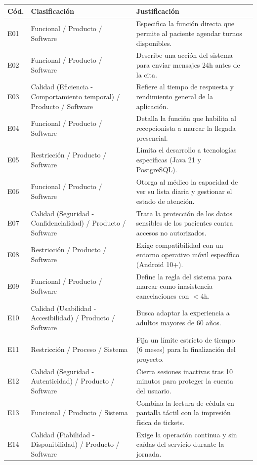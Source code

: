 \documentclass[11pt, a4paper]{article}
\begin{document}
\begin{table}[h!]
\small
\centering
\begin{tabularx}{\textwidth}{l X X l}
\toprule
\textbf{C\'od.} & \textbf{Clasificaci\'on} & \textbf{Justificaci\'on} \\
\midrule
E01 & Funcional / Producto / Software & Especifica la funci\'on directa que permite al paciente agendar turnos disponibles. \\
E02 & Funcional / Producto / Software & Describe una acci\'on del sistema para enviar mensajes 24h antes de la cita. \\
E03 & Calidad (Eficiencia - Comportamiento temporal) / Producto / Software & Refiere al tiempo de respuesta y rendimiento general de la aplicaci\'on. \\
E04 & Funcional / Producto / Software & Detalla la funci\'on que habilita al recepcionista a marcar la llegada presencial. \\
E05 & Restricci\'on / Producto / Software & Limita el desarrollo a tecnolog\'ias espec\'ificas (Java 21 y PostgreSQL). \\
E06 & Funcional / Producto / Software & Otorga al m\'edico la capacidad de ver su lista diaria y gestionar el estado de atenci\'on. \\
E07 & Calidad (Seguridad - Confidencialidad) / Producto / Software & Trata la protecci\'on de los datos sensibles de los pacientes contra accesos no autorizados. \\
E08 & Restricci\'on / Producto / Software & Exige compatibilidad con un entorno operativo m\'ovil espec\'ifico (Android 10+). \\
E09 & Funcional / Producto / Software & Define la regla del sistema para marcar como inasistencia cancelaciones con $<$4h. \\
E10 & Calidad (Usabilidad - Accesibilidad) / Producto / Software & Busca adaptar la experiencia a adultos mayores de 60 a\~nos. \\
E11 & Restricci\'on / Proceso / Sistema & Fija un l\'imite estricto de tiempo (6 meses) para la finalizaci\'on del proyecto. \\
E12 & Calidad (Seguridad - Autenticidad) / Producto / Software & Cierra sesiones inactivas tras 10 minutos para proteger la cuenta del usuario. \\
E13 & Funcional / Producto / Sistema & Combina la lectura de c\'edula en pantalla t\'actil con la impresi\'on f\'isica de tickets. \\
E14 & Calidad (Fiabilidad - Disponibilidad) / Producto / Software & Exige la operaci\'on continua y sin ca\'idas del servicio durante la jornada. \\

\end{tabularx}
\end{table}
\end{document}
